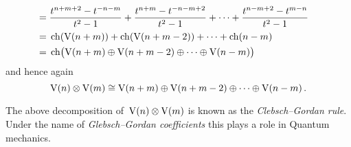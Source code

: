 \begin{itemize}
\begin{align*}
      \\
      ={}&
        \frac{t^{n+m+2} - t^{-n-m}}{t^2 - 1}
      + \frac{t^{n+m} - t^{-n-m+2}}{t^2 - 1}
      + \dotsb
      + \frac{t^{n-m+2} - t^{m-n}}{t^2 - 1}
      \\
      ={}&
      \operatorname{ch}(\operatorname{V}(n+m)) + \operatorname{ch}(\operatorname{V}(n+m-2)) + \dotsb + \operatorname{ch}(n-m)
      \\
      ={}&
      \operatorname{ch}\bigl( \operatorname{V}(n+m) \oplus \operatorname{V}(n+m-2) \oplus \dotsb \oplus \operatorname{V}(n-m) \bigr)
    \end{align*}
    and hence again
    \[
      \operatorname{V}(n) \otimes \operatorname{V}(m)
      \cong
      \operatorname{V}(n+m) \oplus \operatorname{V}(n+m-2) \oplus \dotsb \oplus \operatorname{V}(n-m) \,.
    \]
\end{itemize}

The above decomposition of~$\operatorname{V}(n) \otimes \operatorname{V}(m)$ is known as the \emph{Clebsch--Gordan rule}.
Under the name of \emph{Glebsch--Gordan coefficients} this plays a role in Quantum mechanics.




